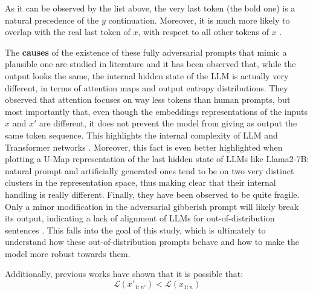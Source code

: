 \documentclass[../thesis]{subfiles}
\begin{document}
As it can be observed by the list above, the very last token (the bold one) is a natural precedence of the $y$ continuation. Moreover, it is much more likely to overlap with the real last token of $x$, with respect to all other tokens of $x$ \cite{eviltwinsarenotthatevil}.

The \textbf{causes} of the existence of these fully adversarial prompts that mimic a plausible one are studied in literature 
and it has been observed that, while the output looks the same, the internal hidden state of the LLM is actually very different, in terms of attention maps and output entropy distributions.
They observed that attention focuses on way less tokens than human prompts, but most importantly that, even though the embeddings representations of the inputs $x$ and $x'$ are different, it does not prevent the model from giving as output the same token sequence. This highlights the internal complexity of LLM and Transformer networks
\citep{kervadec2023unnaturallanguageprocessinglanguage}.
Moreover, this fact is even better highlighted when plotting a U-Map representation of the last hidden state of LLMs like Llama2-7B:
natural prompt and artificially generated ones tend to be on two very distinct clusters in the representation space, thus making clear that their internal handling is really different.
Finally, they have been observed to be quite fragile. Only a minor modification in the adversarial gibberish prompt will likely break its output, indicating a lack of alignment of LLMs for out-of-distribution sentences
\citep{cherepanova2024talkingnonsenseprobinglarge}.
This falls into the goal of this study, which is ultimately to understand how these out-of-distribution prompts behave and how to make the model more robust towards them.

Additionally, previous works \citep{evaluatinggcgpgd-hwp} have shown that it is possible that:
\begin{equation}
    \mathcal{L}(x'_{1:n'}) < \mathcal{L}(x_{1:n})
\end{equation}
\end{document}
